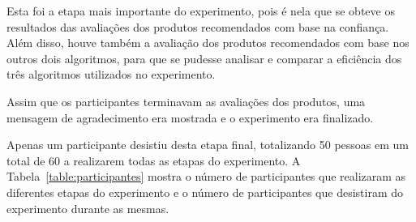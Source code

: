 Esta foi a etapa mais importante do experimento, pois é nela que se obteve os resultados das avaliações dos produtos recomendados com base na confiança. Além disso, houve também a avaliação dos produtos recomendados com base nos outros dois algoritmos, para que se pudesse analisar e comparar a eficiência dos três algoritmos utilizados no experimento.

Assim que os participantes terminavam as avaliações dos produtos, uma mensagem de agradecimento era mostrada e o experimento era finalizado.

Apenas um participante desistiu desta etapa final, totalizando 50 pessoas em um total de 60 a realizarem todas as etapas do experimento. A Tabela~\ref{table:participantes} mostra o número de participantes que realizaram as diferentes etapas do experimento e o número de participantes que desistiram do experimento durante as mesmas.